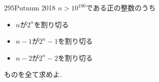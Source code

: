 \begin{prob}{295}{}{Putnum 2018}
    $n>10^{100}$である正の整数のうち
    \begin{itemize}
\item $n$が$2^n$を割り切る
\item $n-1$が$2^{n}-1$を割り切る
\item $n-2$が$2^{n}-2$を割り切る
    \end{itemize}
    ものを全て求めよ.
\end{prob}
